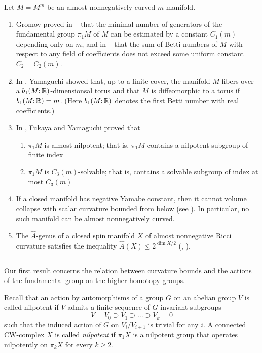 \documentclass{amsart}
\begin{document}
Let $M=M^m$ be an almost nonnegatively curved $m$-manifold.
\begin{enumerate}[$\diamond$]
\item Gromov proved in ~\cite{G1}
that the minimal number of generators of the fundamental
group $\pi_1M$ of $M$ can be estimated by a constant $C_1(m)$
depending only on $m$,
and in ~\cite{G2} that the sum of Betti numbers of $M$ with
respect to any field of coefficients
does not exceed some uniform constant $C_2=C_2(m)$.
\item In \cite{Yam},
Yamaguchi showed that, up to a finite cover, the manifold $M$
fibers over a $b_1(M;{\Bbb R})$-dimensionsal torus
and that $M$ is diffeomorphic to a torus if $b_1(M;{\Bbb R})\z=m$. (Here $b_1(M;{\Bbb R})$ denotes the first Betti number with real coefficients.)
\item In \cite{FY},
Fukaya and Yamaguchi proved that 
\begin{enumerate}[$\circ$]
\item $\pi_1M$ is almost nilpotent;
that is, $\pi_1M$ contains a nilpotent subgroup of finite index
\item $\pi_1M$ is $C_3(m)$-solvable;
that is, contains a solvable subgroup of index at most $C_3(m)$
\end{enumerate}
\item If a closed manifold has  negative Yamabe constant,
then it cannot volume collapse with scalar curvature bounded from below
(see \cite{Sch,Lb}).  In particular, no such manifold
can be almost nonnegatively curved.
\item The $\hat{A}$-genus of a closed spin manifold $X$
of almost nonnegative Ricci curvature satisfies the inequality
$\hat{A}(X)\le 2^{\dim X/2}$ (\cite{G5}, \cite{Ga}).
\end{enumerate}

\subsection{}
Our first result concerns the relation between curvature bounds and the actions of the fundamental group on the higher homotopy groups.



Recall that an action by automorphisms of a group $G$ on an abelian group $V$
is called nilpotent if $V$
admits a finite sequence of $G$-invariant subgroups
 $$V=V_0\supset V_1\supset\ldots\supset V_k=0$$
such that the induced action of $G$ on $V_i/V_{i+1}$ is trivial for any $i$.
A connected CW-complex $X$ is called \emph{nilpotent}
if $\pi_1X$ is a nilpotent group that operates nilpotently
on $\pi_kX$ for every $k\ge 2$.
\end{document}
